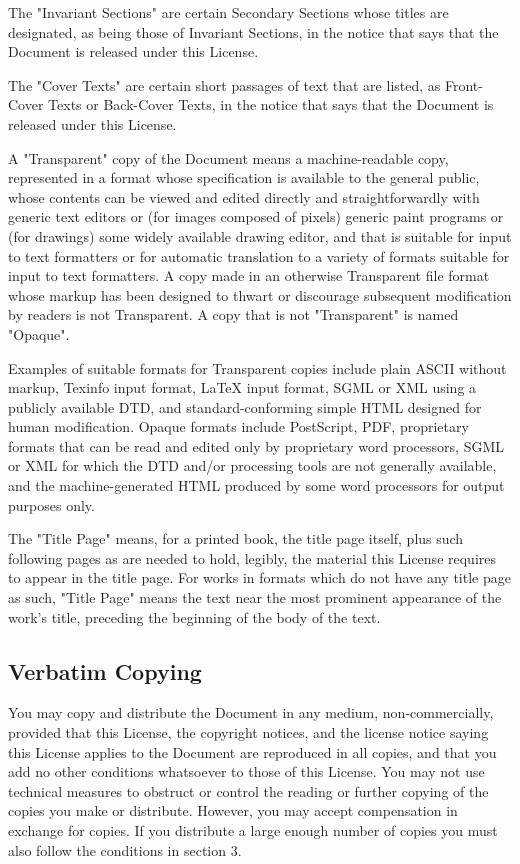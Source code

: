	The "Invariant Sections" are certain Secondary Sections whose titles are designated, as being those of Invariant Sections, in the notice that says that the Document is released under this License. 

	The "Cover Texts" are certain short passages of text that are listed, as Front-Cover Texts or Back-Cover Texts, in the notice that says that the Document is released under this License. 

	A "Transparent" copy of the Document means a machine-readable copy, represented in a format whose specification is available to the general public, whose contents can be viewed and edited directly and straightforwardly with generic text editors or (for images composed of pixels) generic paint programs or (for drawings) some widely available drawing editor, and that is suitable for input to text formatters or for automatic translation to a variety of formats suitable for input to text formatters. A copy made in an otherwise Transparent file format whose markup has been designed to thwart or discourage subsequent modification by readers is not Transparent. A copy that is not "Transparent" is named "Opaque". 

	Examples of suitable formats for Transparent copies include plain ASCII without markup, Texinfo input format, LaTeX input format, SGML or XML using a publicly available DTD, and standard-conforming simple HTML designed for human modification. Opaque formats include PostScript, PDF, proprietary formats that can be read and edited only by proprietary word processors, SGML or XML for which the DTD and/or processing tools are not generally available, and the machine-generated HTML produced by some word processors for output purposes only. 

	The "Title Page" means, for a printed book, the title page itself, plus such following pages as are needed to hold, legibly, the material this License requires to appear in the title page. For works in formats which do not have any title page as such, "Title Page" means the text near the most prominent appearance of the work's title, preceding the beginning of the body of the text. 

	\subsection{Verbatim Copying} 
	You may copy and distribute the Document in any medium, non-commercially, provided that this License, the copyright notices, and the license notice saying this License applies to the Document are reproduced in all copies, and that you add no other conditions whatsoever to those of this License. You may not use technical measures to obstruct or control the reading or further copying of the copies you make or distribute. However, you may accept compensation in exchange for copies. If you distribute a large enough number of copies you must also follow the conditions in section 3. 

